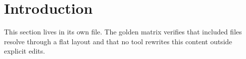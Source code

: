 \section{Introduction}
This section lives in its own file. The golden matrix verifies that included
files resolve through a flat layout and that no tool rewrites this content
outside explicit edits.
